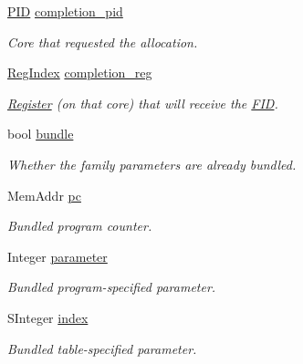 \begin{DoxyCompactItemize}
\hyperlink{namespace_simulator_aa671021151c047ae2da6dce4e6303476}{P\+I\+D} \hyperlink{struct_simulator_1_1drisc_1_1_allocator_1_1_alloc_request_ad32cee2268de2b062c57e95e20e8fdb9}{completion\+\_\+pid}
\begin{DoxyCompactList}\small\item\em Core that requested the allocation. \end{DoxyCompactList}\item 
\hyperlink{namespace_simulator_ab00c9033de4c9a17db7b53d6c292515c}{Reg\+Index} \hyperlink{struct_simulator_1_1drisc_1_1_allocator_1_1_alloc_request_a7d268fde8717658ef2f26fb95e9c4786}{completion\+\_\+reg}
\begin{DoxyCompactList}\small\item\em \hyperlink{class_simulator_1_1_register}{Register} (on that core) that will receive the \hyperlink{struct_simulator_1_1_f_i_d}{F\+I\+D}. \end{DoxyCompactList}\item 
bool \hyperlink{struct_simulator_1_1drisc_1_1_allocator_1_1_alloc_request_ab75db5e75f45658a27b8c4ea89043240}{bundle}
\begin{DoxyCompactList}\small\item\em Whether the family parameters are already bundled. \end{DoxyCompactList}\item 
Mem\+Addr \hyperlink{struct_simulator_1_1drisc_1_1_allocator_1_1_alloc_request_ac3d1fd55490ac20bf2d0a6ee06883952}{pc}
\begin{DoxyCompactList}\small\item\em Bundled program counter. \end{DoxyCompactList}\item 
Integer \hyperlink{struct_simulator_1_1drisc_1_1_allocator_1_1_alloc_request_ad6fa8a5ab6dc2c363ec2d6de2c1d2566}{parameter}
\begin{DoxyCompactList}\small\item\em Bundled program-\/specified parameter. \end{DoxyCompactList}\item 
S\+Integer \hyperlink{struct_simulator_1_1drisc_1_1_allocator_1_1_alloc_request_a30e54ac67d3c145e6b57ac92ac7f306b}{index}
\begin{DoxyCompactList}\small\item\em Bundled table-\/specified parameter. \end{DoxyCompactList}\end{DoxyCompactItemize}


